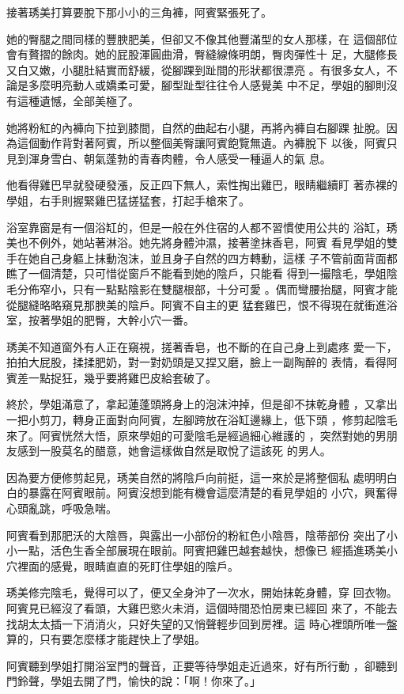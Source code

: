 接著琇美打算要脫下那小小的三角褲，阿賓緊張死了。

她的臀腿之間同樣的豐腴肥美，但卻又不像其他豐滿型的女人那樣，在
這個部位會有贅摺的餘肉。她的屁股渾圓曲滑，臀縫線條明朗，臀肉彈性十
足，大腿修長又白又嫩，小腿肚結實而舒緩，從腳踝到趾間的形狀都很漂亮
。有很多女人，不論是多麼明亮動人或嬌柔可愛，腳型趾型往往令人感覺美
中不足，學姐的腳則沒有這種遺憾，全部美極了。

她將粉紅的內褲向下拉到膝間，自然的曲起右小腿，再將內褲自右腳踝
扯脫。因為這個動作背對著阿賓，所以整個美臀讓阿賓飽覽無遺。內褲脫下
以後，阿賓只見到渾身雪白、朝氣蓬勃的青春肉體，令人感受一種逼人的氣
息。

他看得雞巴早就發硬發漲，反正四下無人，索性掏出雞巴，眼睛繼續盯
著赤裸的學姐，右手則握緊雞巴猛搓猛套，打起手槍來了。

浴室靠窗是有一個浴缸的，但是一般在外住宿的人都不習慣使用公共的
浴缸，琇美也不例外，她站著淋浴。她先將身體沖濕，接著塗抹香皂，阿賓
看見學姐的雙手在她自己身軀上抹動泡沫，並且身子自然的四方轉動，這樣
子不管前面背面都瞧了一個清楚，只可惜從窗戶不能看到她的陰戶，只能看
得到一撮陰毛，學姐陰毛分佈窄小，只有一點點陰影在雙腿根部，十分可愛
。偶而彎腰抬腿，阿賓才能從腿縫略略窺見那腴美的陰戶。阿賓不自主的更
猛套雞巴，恨不得現在就衝進浴室，按著學姐的肥臀，大幹小穴一番。

琇美不知道窗外有人正在窺視，搓著香皂，也不斷的在自己身上到處疼
愛一下，拍拍大屁股，揉揉肥奶，對一對奶頭是又捏又磨，臉上一副陶醉的
表情，看得阿賓差一點捉狂，幾乎要將雞巴皮給套破了。

終於，學姐滿意了，拿起蓮蓬頭將身上的泡沫沖掉，但是卻不抹乾身體
，又拿出一把小剪刀，轉身正面對向阿賓，左腳跨放在浴缸邊緣上，低下頭
，修剪起陰毛來了。阿賓恍然大悟，原來學姐的可愛陰毛是經過細心維護的
，突然對她的男朋友感到一股莫名的醋意，她會這樣做自然是取悅了這該死
的男人。

因為要方便修剪起見，琇美自然的將陰戶向前挺，這一來於是將整個私
處明明白白的暴露在阿賓眼前。阿賓沒想到能有機會這麼清楚的看見學姐的
小穴，興奮得心頭亂跳，呼吸急喘。

阿賓看到那肥沃的大陰唇，與露出一小部份的粉紅色小陰唇，陰蒂部份
突出了小小一點，活色生香全部展現在眼前。阿賓把雞巴越套越快，想像已
經插進琇美小穴裡面的感覺，眼睛直直的死盯住學姐的陰戶。

琇美修完陰毛，覺得可以了，便又全身沖了一次水，開始抹乾身體，穿
回衣物。阿賓見已經沒了看頭，大雞巴慾火未消，這個時間恐怕房東已經回
來了，不能去找胡太太插一下消消火，只好失望的又悄聲輕步回到房裡。這
時心裡頭所唯一盤算的，只有要怎麼樣才能趕快上了學姐。

阿賓聽到學姐打開浴室門的聲音，正要等待學姐走近過來，好有所行動
，卻聽到門鈴聲，學姐去開了門，愉快的說：「啊！你來了。」

